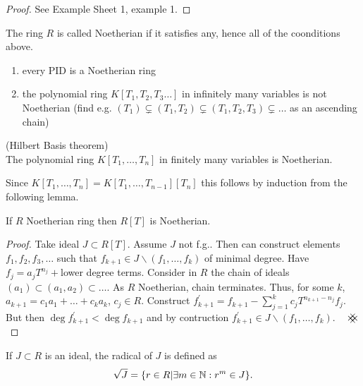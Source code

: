 \documentclass[a4paper,11pt]{article}
\begin{document}
			\begin{proof}
				See Example Sheet 1, example 1.
			\end{proof}

			\begin{defi}
				The ring $R$ is called Noetherian if it satisfies any, hence all of the coonditions above.
			\end{defi}

			\begin{eg}
				\begin{enumerate}
					\item every PID is a Noetherian ring
					\item the polynomial ring $K[T_1,T_2,T_3\dots]$ in infinitely many variables is not Noetherian (find e.g. $(T_1)\subsetneq(T_1,T_2)\subsetneq(T_1,T_2,T_3)\subsetneq\dots$ as an ascending chain)
				\end{enumerate}
			\end{eg}

			\begin{thm}
				{\normalfont(Hilbert Basis theorem)}\\The polynomial ring $K[T_1,\dots,T_n]$ in finitely many variables is Noetherian.
			\end{thm}
			Since $K[T_1,\dots,T_n]=K[T_1,\dots,T_{n-1}][T_n]$ this follows by induction from the following lemma.

			\begin{lemma}
				If $R$ Noetherian ring then $R[T]$ is Noetherian.
			\end{lemma}
			\begin{proof}
				Take ideal $J\subset R[T]$. Assume $J$ not f.g.. Then can construct elements $f_1,f_2,f_3,\dots$ such that $f_{k+1}\in J\backslash(f_1,\dots,f_k)$ of minimal degree. Have $f_j=a_jT^{n_j}+$lower degree terms. Consider in $R$ the chain of ideals $(a_1)\subset(a_1,a_2)\subset\dots$. As $R$ Noetherian, chain terminates. Thus, for some $k$, $a_{k+1}=c_1a_1+\dots+c_ka_k$, $c_j\in R$. Construct $f_{k+1}^{\prime}=f_{k+1}-\sum_{j=1}^{k}c_jT^{n_{k+1}-n_j}f_j$. But then $\deg f^{\prime}_{k+1}<\deg f_{k+1}$ and by contruction $f^{\prime}_{k+1}\in J\backslash(f_1,\dots,f_k)$. $\contradiction$
			\end{proof}

			\begin{defi}
				If $J\subset R$ is an ideal, the radical of $J$ is defined as \[\sqrt{J}=\{r\in R|\exists m\in \mathbb{N}:r^m\in J\}.\]
			\end{defi}
\end{document}
